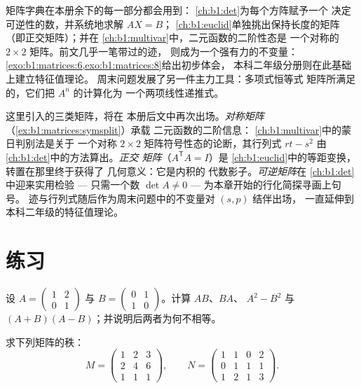 \begin{remark}[矩阵字典的去向]
\label{rem:b1:matrices:whereused}
矩阵字典在本册余下的每一部分都会用到：
\cref{ch:b1:det}为每个方阵赋予一个
决定可逆性的数，并系统地求解 $AX = B$；
\cref{ch:b1:euclid}单独挑出保持长度的矩阵
（即正交矩阵）；并在
\cref{ch:b1:multivar}中，二元函数的二阶性态是
一个对称的 $2 \times 2$ 矩阵。前文几乎一笔带过的迹，
则成为一个强有力的不变量：
\cref{exo:b1:matrices:6,exo:b1:matrices:8}给出初步体会，
本科二年级分册则在此基础上建立特征值理论。
周末问题发展了另一件主力工具：多项式恒等式
矩阵所满足的，它们把 $A^n$ 的计算化为
一个两项线性递推式。
\end{remark}

\begin{remark}[第 3 册内的展望]
\label{rem:b1:matrices:perspectives}
这里引入的三类矩阵，将在
本册后文中再次出场。\emph{对称矩阵}
（\cref{ex:b1:matrices:symsplit}）承载
二元函数的二阶信息：
\cref{ch:b1:multivar}中的蒙日判别法是关于
一个对称 $2\times2$ 矩阵符号性态的论断，其行列式 $rt - s^2$
由\cref{ch:b1:det}中的方法算出。\emph{正交
矩阵}（$A^{\mathsf T}A = I$）是
\cref{ch:b1:euclid}中的等距变换，转置在那里终于获得了
几何意义：它是内积的
代数影子。\emph{可逆矩阵}在
\cref{ch:b1:det}中迎来实用检验 --- 只需一个数 $\det A \neq 0$ ---
为本章开始的行化简探寻画上句号。
迹与行列式随后作为周末问题中的不变量对 $(s, p)$ 结伴出场，
一直延伸到
本科二年级的特征值理论。
\end{remark}

\section{练习}

\begin{exercise}[$\star$]\label{exo:b1:matrices:1}
设 $A = \begin{pmatrix} 1 & 2 \\ 0 & 1 \end{pmatrix}$ 与 $B =
\begin{pmatrix} 0 & 1 \\ 1 & 0\end{pmatrix}$。计算 $AB$、$BA$、
$A^2 - B^2$ 与 $(A+B)(A-B)$；并说明后两者为何不相等。
\end{exercise}

\begin{exercise}[$\star$]\label{exo:b1:matrices:2}
求下列矩阵的秩：
\[
M = \begin{pmatrix}
1 & 2 & 3\\
2 & 4 & 6\\
1 & 1 & 1
\end{pmatrix},
\qquad
N = \begin{pmatrix}
1 & 1 & 0 & 2\\
0 & 1 & 1 & 1\\
1 & 2 & 1 & 3
\end{pmatrix}.
\]
\end{exercise}

